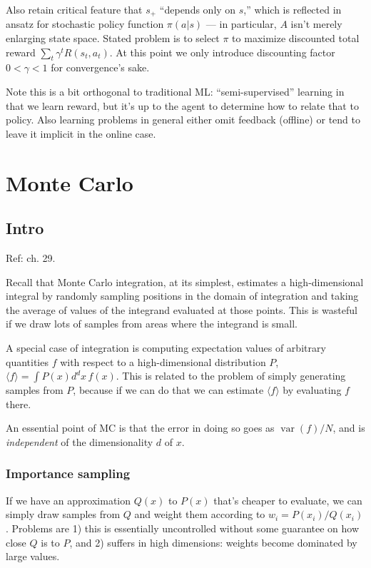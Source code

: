 \documentclass[notitlepage,openany,11pt]{report}
\DeclareMathOperator{\var}{var}
\theoremstyle{plain}%
\numberwithin{equation}{section}
\begin{document}
Also retain critical feature that $s_{+}$ ``depends only on $s$,''  which is reflected in ansatz for stochastic policy function $\pi(a|s)$ --- in particular, $A$ isn't merely enlarging state space. Stated problem is to select $\pi$ to maximize discounted total reward $\sum_{t} \gamma^{t} R(s_{t}, a_{t})$. At this point we only introduce discounting factor $0 < \gamma < 1$ for convergence's sake.

Note this is a bit orthogonal to traditional ML: ``semi-supervised'' learning in that we learn reward, but it's up to the agent to determine how to relate that to policy. Also learning problems in general either omit feedback (offline) or tend to leave it implicit in the online case.

\section{Monte Carlo} 

\subsection{Intro} Ref: \cite{MacKay:03} ch. 29.

Recall that Monte Carlo integration, at its simplest, estimates a high-dimensional integral by randomly sampling positions in the domain of integration  and taking the average of values of the integrand evaluated at those points. This is wasteful if we draw lots of samples from areas where the integrand is small.

A special case of integration is computing expectation values of arbitrary quantities $f$ with respect to a high-dimensional distribution $P$, $\langle f \rangle = \int \! P(x) d^{d} x \, f(x)$. This is related to the problem of simply generating samples from $P$, because if we can do that we can estimate  $\langle f \rangle$ by evaluating $f$ there. 

An essential point of MC is that the error in doing so goes as $\var(f) / N$, and is \emph{independent} of the dimensionality $d$ of $x$. 

\subsubsection{Importance sampling} 
If we have an approximation $Q(x)$ to $P(x)$ that's cheaper to evaluate, we can simply draw samples from $Q$ and weight them according to $w_{i} = P(x_{i}) / Q(x_{i})$. Problems are 1) this is essentially uncontrolled without some guarantee on how close $Q$ is to $P$, and 2) suffers in high dimensions: weights become dominated by large values.
\end{document}
